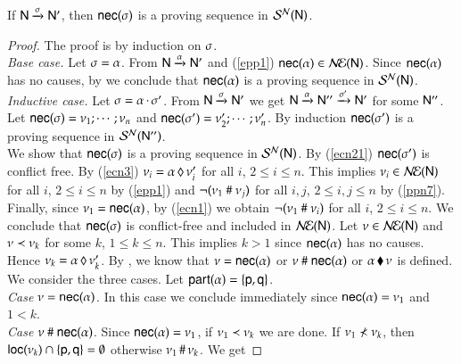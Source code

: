 \begin{theorem}  If ${\sf N}\xrightarrow{\sigma}{\sf N}'$, 
  then ${\sf nec}(\sigma)$ is a proving sequence in $\mathcal{S}^{\mathcal{N}}({\sf N})$.
\end{theorem}
\begin{proof}
  The proof is by  induction on ${\sigma}$.\\
 \emph{Base case.}  Let $\sigma=\alpha$. 
From
  ${\sf N}\xrightarrow{\alpha}{\sf N}'$ and  (\ref{epp1})
${\sf nec}(\alpha)\in\mathcal{N\!E}({\sf N})$. Since ${\sf nec}(\alpha)$ has no causes, 
by  we conclude that ${\sf nec}(\alpha)$
is a proving sequence in $\mathcal{S}^{\mathcal{N}}({\sf N})$.
\\
\emph{Inductive case.}
%
\noindent
Let
  $\sigma=\alpha\,{\cdot}\,\sigma'$.
From
${\sf N}\xrightarrow{\sigma}{\sf N}'$ we get
${\sf N}\xrightarrow{\alpha}{\sf N}''\xrightarrow{\sigma'}{\sf N}'$ for some
${\sf N}''$. Let ${\sf nec}(\sigma)=\nu_1;\cdots;\nu_{n}$ and
${\sf nec}(\sigma')=\nu'_2;\cdots ;\nu'_{n}$.  By induction
${\sf nec}(\sigma')$ is a proving sequence in 
$\mathcal{S}^{\mathcal{N}}({\sf N}'')$.  \\
We show that ${\sf nec}(\sigma)$ is a proving sequence in 
$\mathcal{S}^{\mathcal{N}}({\sf N})$.  By
(\ref{ecn21}) ${\sf nec}(\sigma')$ is conflict free.  By
(\ref{ecn3}) $\nu_i={\alpha}\,\lozenge\,{\nu_i'}$ for
all $i$, $2\leq i\leq n$. This implies $\nu_i\in\mathcal{N\!E}({\sf N})$ for all
$i$, $2\leq i\leq n$ by (\ref{epp1}) and
$\neg{(\nu_1\ensuremath{~\#~}\nu_j)}$ for all $i,j$, $2\leq i,j\leq n$ by
(\ref{ppn7}).   Finally, since
$\nu_1={\sf nec}(\alpha)$,  by (\ref{ecn1}) we
obtain $\neg{(\nu_1\ensuremath{~\#~}\nu_i)}$ for all $i$, $2\leq i\leq n$.  We
conclude that ${\sf nec}(\sigma)$ is conflict-free  and included in $\mathcal{N\!E}({\sf N})$.    Let
$\nu\in\mathcal{N\!E}({\sf N})$ and $\nu\prec \nu_k$ for some $k$, $1\leq
k\leq n$.  This implies $k > 1$  since ${\sf nec}(\alpha)$ has no
causes. Hence $\nu_k={\alpha}\,\lozenge\,{\nu_k'}$.  By ,  we know that 
$\nu={\sf nec}(\alpha)$ or $\nu~\#~{\sf nec}(\alpha)$ or
${\alpha}\,\blacklozenge\,{\nu}$ is defined.  We consider the three
cases. Let ${\sf part}(\alpha)=\{{\sf p},{\sf q}\}$. \\  
 {\em Case $\nu = {\sf nec}(\alpha)$}. In this case
we conclude immediately since ${\sf nec}(\alpha) = \nu_1$ and $1<k$. \\
{\em Case $\nu~\#~{\sf nec}(\alpha)$}.  Since ${\sf nec}(\alpha)=
\nu_1$,  if
$\nu_1\prec\nu_k$  we are done. 
If $\nu_1\not\prec\nu_k$,  then ${\sf loc}(\nu_k) \cap \{{\sf p},{\sf q}\} =
\emptyset$   
% 
otherwise $\nu_1\,\#\,\nu_k$. 
% 
We get %

\end{proof}

